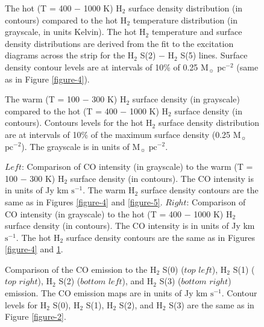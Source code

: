 \documentclass[manuscript]{aastex}
\begin{document}
\clearpage
\begin{figure}
\caption{The hot (T = 400 $-$ 1000 K) H$_2$ surface density distribution (in contours) 
compared to the hot H$_2$ temperature distribution (in grayscale, in units Kelvin).  
The hot H$_2$ temperature and surface density distributions are derived from the 
fit to the excitation diagrams across the strip for the H$_2$ S(2) $-$ H$_2$ S(5) lines.  Surface density 
contour levels are at intervals of 10\% of 0.25 $\mathrm{M_\sun}$ $\mathrm{pc^{-2}}$ (same as in Figure \ref{figure-4}).}
\label{figure-6}
\end{figure}

\clearpage

\begin{figure}
\caption{The warm (T = 100 $-$ 300 K) H$_2$ surface density (in grayscale) compared to
 the hot (T = 400 $-$ 1000 K) H$_2$ surface density (in contours).  Contours levels for the 
 hot H$_2$ surface density distribution are at intervals of 10\% of the maximum surface density 
 (0.25 $\mathrm{M_\sun}$ $\mathrm{pc^{-2}}$).  The grayscale is in units of 
 $\mathrm{M_\sun}$ $\mathrm{pc^{-2}}$.}
\label{figure-7}
\end{figure}

\clearpage

\begin{figure}
\caption{$Left$: Comparison of  CO intensity (in grayscale) to the warm (T = 100 $-$ 300 K) 
H$_2$ surface density (in contours).  The CO intensity is in units of Jy km $\mathrm{s^{-1}}$. 
The warm H$_2$ surface density contours are the same as in Figures \ref{figure-4} and \ref{figure-5}.  
$Right$: Comparison of CO intensity (in grayscale) to the hot (T = 400 $-$ 1000 K) 
H$_2$ surface density (in contours).  The CO intensity is in units of Jy km 
$\mathrm{s^{-1}}$. The hot H$_2$ surface density contours are the same as in 
Figures \ref{figure-4} and \ref{figure-6}.}
\label{figure-8}
\end{figure}

\clearpage

\begin{figure}
\caption{Comparison of the CO emission to the H$_2$ S(0) ($top$ $left$), 
 H$_2$ S(1) ($top$ $right$),  H$_2$ S(2) ($bottom$ $left$),  and 
 H$_2$ S(3) ($bottom$ $right$) emission.  The CO emission maps are in 
 units of Jy km $\mathrm{s^{-1}}$.  Contour levels for H$_2$ S(0), 
 H$_2$ S(1), H$_2$ S(2), and H$_2$ S(3) are the 
 same as in Figure \ref{figure-2}.}
\label{figure-9}
\end{figure}
\end{document}
